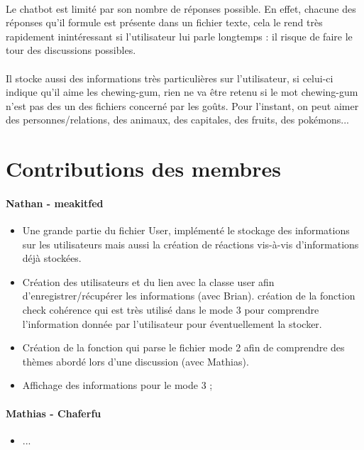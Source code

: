 \documentclass[paper=a4, fontsize=11pt]{article}
\begin{document}
\paragraph{} Le chatbot est limité par son nombre de réponses possible. En effet, chacune des réponses qu’il formule est présente dans un fichier texte, cela le rend très rapidement inintéressant si l’utilisateur lui parle longtemps : il risque de faire le tour des discussions possibles. 
\paragraph{} Il stocke aussi des informations très particulières sur l’utilisateur, si celui-ci indique qu’il aime les chewing-gum, rien ne va être retenu si le mot chewing-gum n’est pas des un des fichiers concerné par les goûts. Pour l’instant, on peut aimer des personnes/relations, des animaux, des capitales, des fruits, des pokémons...

\vspace{0.5cm}

\section{Contributions des membres}

\paragraph{Nathan - meakitfed}
\begin{itemize}
\item Une grande partie du fichier User, implémenté le stockage des informations sur les utilisateurs mais aussi la création de réactions vis-à-vis d'informations déjà stockées.
\item Création des utilisateurs et du lien avec la classe user afin d’enregistrer/récupérer les informations (avec Brian).
création de la fonction check cohérence qui est très utilisé dans le mode 3 pour comprendre l’information donnée par l’utilisateur pour éventuellement la stocker.
\item Création de la fonction qui parse le fichier mode 2 afin de comprendre des thèmes abordé lors d’une discussion (avec Mathias).
\item Affichage des informations pour le mode 3 ;
\end{itemize}

\paragraph{Mathias - Chaferfu} 
\begin{itemize}
\item ...
\end{itemize}
\end{document}
